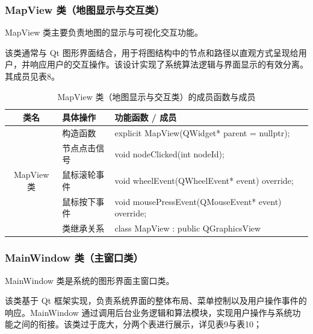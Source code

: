 \documentclass[UTF8,12pt,a4paper]{ctexart}
\begin{document}
\subsubsection{MapView 类（地图显示与交互类）}

MapView 类主要负责地图的显示与可视化交互功能。

该类通常与 Qt 图形界面结合，用于将图结构中的节点和路径以直观方式呈现给用户，并响应用户的交互操作。该设计实现了系统算法逻辑与界面显示的有效分离。 其成员见表8。

\begin{table}[H]
\centering
\caption{MapView 类（地图显示与交互类）的成员函数与成员}
\renewcommand{\arraystretch}{1.3}
\begin{tabular}{|
c|
>{\centering\arraybackslash}m{4cm}|
>{\centering\arraybackslash}m{9cm}|}
\hline
\textbf{类名} & \textbf{具体操作} & \textbf{功能函数 / 成员} \\
\hline
\multirow{5}{*}{MapView 类}
& 构造函数
& explicit MapView(QWidget* parent = nullptr); \\
\cline{2-3}

& 节点点击信号
& void nodeClicked(int nodeId); \\
\cline{2-3}

& 鼠标滚轮事件
& void wheelEvent(QWheelEvent* event) override; \\
\cline{2-3}

& 鼠标按下事件
& void mousePressEvent(QMouseEvent* event) override; \\
\cline{2-3}

& 类继承关系
& {\centering
  class MapView : public QGraphicsView
}\\
\hline
\end{tabular}
\end{table}


\subsubsection{MainWindow 类（主窗口类）}

MainWindow 类是系统的图形界面主窗口类。

该类基于 Qt 框架实现，负责系统界面的整体布局、菜单控制以及用户操作事件的响应。MainWindow 通过调用后台业务逻辑和算法模块，实现用户操作与系统功能之间的衔接。该类过于庞大，分两个表进行展示，详见表9与表10；
\end{document}
